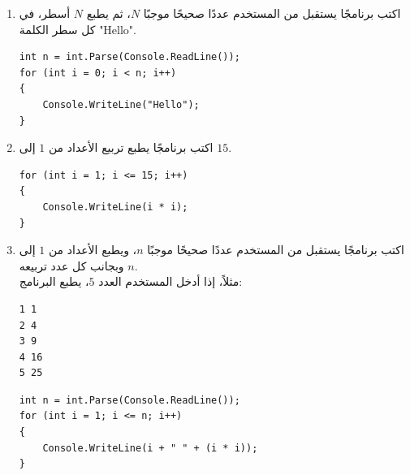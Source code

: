 \documentclass[14pt]{extarticle}
\begin{document}
\begin{enumerate}[resume, itemsep=1em]
\item اكتب برنامجًا يستقبل من المستخدم عددًا صحيحًا موجبًا $N$، ثم يطبع $N$ أسطر، في كل سطر الكلمة \textenglish{"Hello"}.
\ifwithsols
\begin{boxSolution}
\begin{english}
\begin{verbatim}
int n = int.Parse(Console.ReadLine());
for (int i = 0; i < n; i++)
{
    Console.WriteLine("Hello");
}
\end{verbatim}
\end{english}
\end{boxSolution}
\fi
\filbreak

\item اكتب برنامجًا يطبع تربيع الأعداد من $1$ إلى $15$.
\ifwithsols
\begin{boxSolution}
\begin{english}
\begin{verbatim}
for (int i = 1; i <= 15; i++)
{
    Console.WriteLine(i * i);
}
\end{verbatim}
\end{english}
\end{boxSolution}
\fi
\filbreak

\item اكتب برنامجًا يستقبل من المستخدم عددًا صحيحًا موجبًا $n$، ويطبع الأعداد من $1$ إلى $n$ وبجانب كل عدد تربيعه. \\
مثلاً، إذا أدخل المستخدم العدد $5$، يطبع البرنامج:
\begin{boxCode}
\begin{english}
\begin{verbatim}
1 1
2 4
3 9
4 16
5 25
\end{verbatim}
\end{english}
\end{boxCode}
\ifwithsols
\begin{boxSolution}
\begin{english}
\begin{verbatim}
int n = int.Parse(Console.ReadLine());
for (int i = 1; i <= n; i++)
{
    Console.WriteLine(i + " " + (i * i));
}
\end{verbatim}
\end{english}
\end{boxSolution}
\fi
\filbreak

\end{enumerate}

\clearpage
\end{document}
